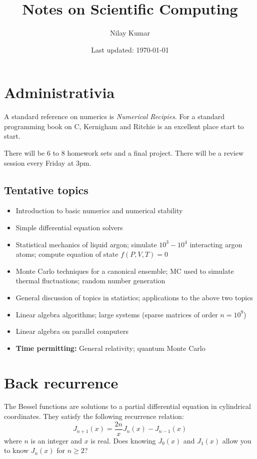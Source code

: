 \documentclass{mathnotes}
\title{Notes on Scientific Computing}
\author{Nilay Kumar}
\date{Last updated: \today}
\begin{document}
\maketitle

\setcounter{section}{-1}

\section{Administrativia}

A standard reference on numerics is \textit{Numerical Recipies}. For a standard programming book on C, Kernigham and Ritchie is an excellent
place start to start. 

There will be 6 to 8 homework sets and a final project. There will be a review session every Friday at 3pm.

\subsection{Tentative topics}
\begin{itemize}
    \item Introduction to basic numerics and numerical stability
    \item Simple differential equation solvers
    \item Statistical mechanics of liquid argon; simulate $10^3-10^4$ interacting argon atoms; compute equation of state $f(P,V,T)=0$
    \item Monte Carlo techniques for a canonical ensemble; MC used to simulate thermal fluctuations; random number generation
    \item General discussion of topics in statistics; applications to the above two topics
    \item Linear algebra algorithms; large systems (sparse matrices of order $n=10^9$)
    \item Linear algebra on parallel computers
    \item \textbf{Time permitting:} General relativity; quantum Monte Carlo
\end{itemize}

\section{Back recurrence}

The Bessel functions are solutions to a partial differential equation in cylindrical coordinates. They satisfy the following recurrence relation:
\[J_{n+1}(x)=\frac{2n}{x}J_n(x)-J_{n-1}(x)\]
where $n$ is an integer and $x$ is real. Does knowing $J_0(x)$ and $J_1(x)$ allow you to know $J_n(x)$ for $n\geq 2$?
\end{document}
